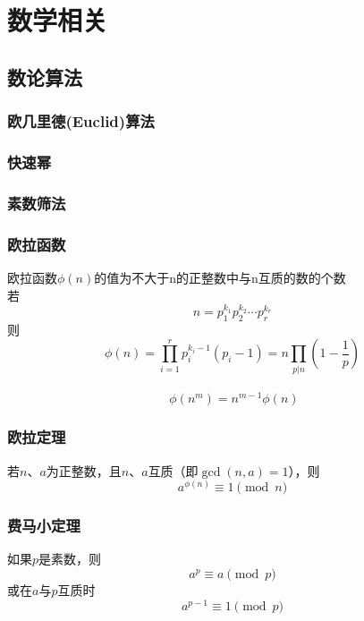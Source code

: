 
\chapter{数学相关}

\section{数论算法}
\subsection{欧几里德(Euclid)算法}
\subsection{快速幂}
\subsection{素数筛法}
\subsection{欧拉函数}
欧拉函数$\phi(n)$的值为不大于n的正整数中与n互质的数的个数\\
若
\begin{displaymath}
n = p_1^{k_1} p_2^{k_2} \cdots p_r^{k_r}
\end{displaymath}
则
\begin{displaymath}
\phi(n) = \prod_{i=1}^{r} p_{i}^{k_{i}-1}(p_{i}-1) = n\prod_{p|n}\left(1-\frac{1}{p}\right)
\end{displaymath}\\
\begin{displaymath}
\;\phi(n^{m}) = n^{m-1}\phi(n) 
\end{displaymath}
\subsection{欧拉定理}
若$n$、$a$为正整数，且$n$、$a$互质（即$\gcd(n,a)=1$），则
\begin{displaymath}
a^{\phi(n)} \equiv 1 \pmod n
\end{displaymath}
\subsection{费马小定理}
如果$p$是素数，则
\begin{displaymath}
a^{p} \equiv a \pmod{p}
\end{displaymath}
或在$a$与$p$互质时
\begin{displaymath}
a^{p-1} \equiv  1 \pmod{p}
\end{displaymath}
